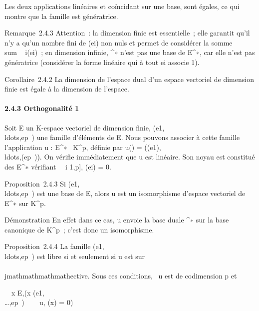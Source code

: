 Les deux applications linéaires \phi et \psi coïncidant sur une base, sont
égales, ce qui montre que la famille est génératrice.

Remarque~2.4.3 Attention~: la dimension finie est essentielle~; elle
garantit qu'il n'y a qu'un nombre fini de \phi(ei) non nuls et
permet de considérer la somme
\\sum ~
i\inI\phi(ei)\phii~; en dimension infinie,
^∗ n'est pas une base de E^∗, car elle n'est pas
génératrice (considérer la forme linéaire \phi qui à tout ei
associe 1).

Corollaire~2.4.2 La dimension de l'espace dual d'un espace vectoriel de
dimension finie est égale à la dimension de l'espace.

\paragraph{2.4.3 Orthogonalité 1}

Soit E un K-espace vectoriel de dimension finie,
(e1,\\ldots,ep~)
une famille d'éléments de E. Nous pouvons associer à cette famille
l'application u : E^∗\rightarrow~ K^p, définie par u(\phi) =
(\phi(e1),\\ldots,\phi(ep~)).
On vérifie immédiatement que u est linéaire. Son noyau est constitué des
\phi \in E^∗ vérifiant \forall~~i \in {[}1,p{]},
\phi(ei) = 0.

Proposition~2.4.3 Si
(e1,\\ldots,ep~)
est une base de E, alors u est un isomorphisme d'espace vectoriel de
E^∗ sur K^p.

Démonstration En effet dans ce cas, u envoie la base duale
^∗ sur la base canonique de K^p~; c'est donc un
isomorphisme.

Proposition~2.4.4 La famille
(e1,\\ldots,ep~)
est libre si et seulement si u est sur\\\\jmathmathmathmathective. Sous ces conditions,
\mathrmKer~u est de
codimension p et

\forall~~x \in E,\quad (x
\in\mathrmVect(e1,\\\ldots,ep~)
\Leftrightarrow \forall~~\phi
\in\mathrmKer~u, \phi(x) = 0)


